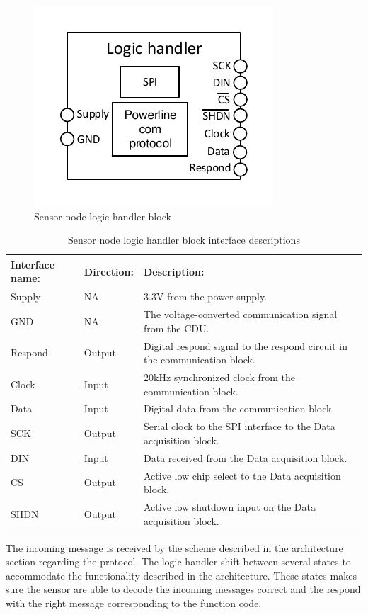\begin{figure}[H]
	\centering
	\includegraphics[width=.5\textwidth]{billeder/logic_handler_sn}
	\caption{Sensor node logic handler block}
	\label{fig:sn_logic_handler}
\end{figure}

\begin{table}[H]
	\centering
	\begin{tabular}{|p{3cm} |p{2cm} | p{8cm}| }
		\hline
		Interface name: 			& Direction: 	& Description: \\ \hline
		Supply						& NA			& 3.3V from the power supply. \\ \hline
		GND							& NA			& The voltage-converted communication signal from the CDU.\\ \hline
		Respond		  				& Output		& Digital respond signal to the respond circuit in the communication block. \\ \hline
		Clock						& Input			& 20kHz synchronized clock from the communication block.\\\hline 
		Data						& Input			& Digital data from the communication block.\\\hline
		SCK							& Output		& Serial clock to the SPI interface to the Data acquisition block.\\\hline
		DIN							& Input			& Data received from the Data acquisition block.\\\hline
		$\overline{\text{CS}}$		& Output		& Active low chip select to the Data acquisition block.\\\hline
		$\overline{\text{SHDN}}$	& Output		& Active low shutdown input on the Data acquisition block.\\\hline
	\end{tabular}
	\caption{Sensor node logic handler block interface descriptions}
\end{table}

The incoming message is received by the scheme described in the architecture section regarding the protocol. The logic handler shift between several states to accommodate the functionality described in the architecture. These states makes sure the sensor are able to decode the incoming messages correct and the respond with the right message corresponding to the function code. 

